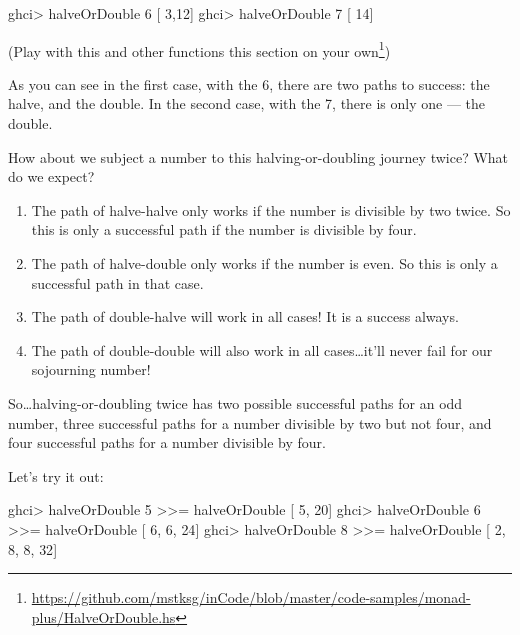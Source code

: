 \documentclass[]{article}
\newenvironment{Shaded}{}{}
\newcommand{\DecValTok}[1]{\textcolor[rgb]{0.25,0.63,0.44}{{#1}}}
\newcommand{\FunctionTok}[1]{\textcolor[rgb]{0.02,0.16,0.49}{{#1}}}
\newcommand{\NormalTok}[1]{{#1}}
\renewcommand{\href}[2]{#2\footnote{\url{#1}}}
\begin{document}
\begin{Shaded}
\begin{Highlighting}[]
\NormalTok{ghci}\FunctionTok{>} \NormalTok{halveOrDouble }\DecValTok{6}
\NormalTok{[ }\DecValTok{3}\NormalTok{,}\DecValTok{12}\NormalTok{]}
\NormalTok{ghci}\FunctionTok{>} \NormalTok{halveOrDouble }\DecValTok{7}
\NormalTok{[   }\DecValTok{14}\NormalTok{]}
\end{Highlighting}
\end{Shaded}

(\href{https://github.com/mstksg/inCode/blob/master/code-samples/monad-plus/HalveOrDouble.hs}{Play
with this and other functions this section on your own})

As you can see in the first case, with the 6, there are two paths to
success: the halve, and the double. In the second case, with the 7,
there is only one --- the double.

How about we subject a number to this halving-or-doubling journey twice?
What do we expect?

\begin{enumerate}
\def\labelenumi{\arabic{enumi}.}
\tightlist
\item
  The path of halve-halve only works if the number is divisible by two
  twice. So this is only a successful path if the number is divisible by
  four.
\item
  The path of halve-double only works if the number is even. So this is
  only a successful path in that case.
\item
  The path of double-halve will work in all cases! It is a success
  always.
\item
  The path of double-double will also work in all cases\ldots{}it'll
  never fail for our sojourning number!
\end{enumerate}

So\ldots{}halving-or-doubling twice has two possible successful paths
for an odd number, three successful paths for a number divisible by two
but not four, and four successful paths for a number divisible by four.

Let's try it out:

\begin{Shaded}
\begin{Highlighting}[]
\NormalTok{ghci}\FunctionTok{>} \NormalTok{halveOrDouble }\DecValTok{5} \FunctionTok{>>=} \NormalTok{halveOrDouble}
\NormalTok{[       }\DecValTok{5}\NormalTok{, }\DecValTok{20}\NormalTok{]}
\NormalTok{ghci}\FunctionTok{>} \NormalTok{halveOrDouble }\DecValTok{6} \FunctionTok{>>=} \NormalTok{halveOrDouble}
\NormalTok{[    }\DecValTok{6}\NormalTok{, }\DecValTok{6}\NormalTok{, }\DecValTok{24}\NormalTok{]}
\NormalTok{ghci}\FunctionTok{>} \NormalTok{halveOrDouble }\DecValTok{8} \FunctionTok{>>=} \NormalTok{halveOrDouble}
\NormalTok{[ }\DecValTok{2}\NormalTok{, }\DecValTok{8}\NormalTok{, }\DecValTok{8}\NormalTok{, }\DecValTok{32}\NormalTok{]}
\end{Highlighting}
\end{Shaded}
\end{document}
